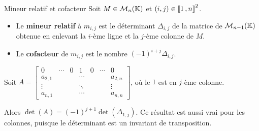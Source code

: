     \begin{defi}{Mineur relatif et cofacteur}{}
        Soit $M \in \mathcal{M}_{n}(\mathbb{K})$ et $(i,j) \in \left\llbracket 1 \, , n \right\rrbracket^2$.
        \begin{itemize}
            \item Le \textbf{mineur relatif} à $m_{i,j}$ est le déterminant $\Delta_{i,j}$ de la matrice de $\mathcal{M}_{n-1}(\mathbb{K})$ obtenue en enlevant la $i$-ème ligne et la $j$-ème colonne de $M$.
            \item Le \textbf{cofacteur} de $m_{i,j}$ est le nombre $(-1)^{i+j} \Delta_{i,j}$.
        \end{itemize}
    \end{defi}

    \begin{lem}{}{}
        Soit $A = \begin{bmatrix}
            0 & \cdots & 0 & 1 & 0 & \cdots & 0 \\
            a_{2,1} & & & \cdots & & & a_{2,n} \\
            \vdots & & & \ddots & & & \vdots \\
            a_{n,1} & & & \cdots & & & a_{n,n}
        \end{bmatrix}$, où le $1$ est en $j$-ème colonne.

        Alors $\det(A) = (-1)^{j + 1} \det(\Delta_{1,j})$. Ce résultat est aussi vrai pour les colonnes, puisque le déterminant est un invariant de transposition.
    \end{lem}

